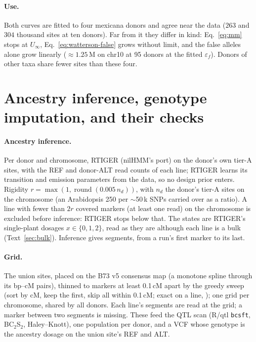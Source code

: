 \documentclass[11pt]{article}
\newcommand{\code}[1]{\texttt{#1}}
\begin{document}
\paragraph{Use.} Both curves are fitted to four mexicana donors and agree near the data ($263$ and $304$ thousand sites at ten
donors). Far from it they differ in kind: Eq.~\eqref{eq:mm} stops at $U_\infty$, Eq.~\eqref{eq:watterson-false} grows without
limit, and the false alleles alone grow linearly ($\approx1.25$\,M on chr10 at 95 donors at the fitted $\varepsilon_f$). Donors of
other taxa share fewer sites than these four.

\section{Ancestry inference, genotype imputation, and their checks}
\label{sec:checks}

\paragraph{Ancestry inference.} Per donor and chromosome, RTIGER \citep{campos2023rtiger} (nilHMM's port) on the donor's own tier-A
sites, with the REF and donor-ALT read counts of each line; RTIGER learns its transition and emission parameters from the data, so no
design prior enters. Rigidity $r=\max(1,\operatorname{round}(0.005\,n_d))$, with $n_d$ the donor's tier-A sites on the chromosome (an
Arabidopsis 250 per $\sim$50\,k SNPs carried over as a ratio). A line with fewer than $2r$ covered markers (at least one read) on the
chromosome is excluded before inference: RTIGER stops below that. The states are RTIGER's single-plant dosages $x\in\{0,1,2\}$, read as
they are although each line is a bulk (Text~\ref{sec:bulk}). Inference gives segments, from a run's first marker to its last.

\paragraph{Grid.} The union sites, placed on the B73 v5 consensus map (a monotone spline through its bp--cM pairs), thinned to markers
at least 0.1\,cM apart by the greedy sweep (sort by cM, keep the first, skip all within 0.1\,cM; exact on a line,
\citealp{jena2018mddis}); one grid per chromosome, shared by all donors. Each line's segments are read at the grid; a marker between two
segments is missing. These feed the QTL scan (R/qtl \code{bcsft}, BC$_2$S$_2$, Haley--Knott), one population per donor, and a VCF
whose genotype is the ancestry dosage on the union site's REF and ALT.
\end{document}
